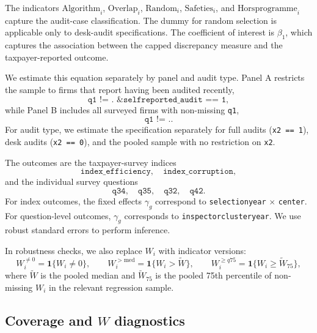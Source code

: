 \documentclass{article}
\newcommand{\OutPath}{Output/}%
\newcommand{\OutPath}{../Output/}%
\begin{document}
The indicators \(\text{Algorithm}_i\), \(\text{Overlap}_i\), \(\text{Random}_i\), \(\text{Safeties}_i\), and \(\text{Horsprogramme}_i\) capture the audit-case classification. The dummy for random selection is applicable only to desk-audit specifications. The coefficient of interest is \(\beta_1\), which captures the association between the capped discrepancy measure and the taxpayer-reported outcome.

We estimate this equation separately by panel and audit type. Panel A restricts the sample to firms that report having been audited recently,
\[
\texttt{q1 != . \& selfreported\_audit == 1},
\]
while Panel B includes all surveyed firms with non-missing \texttt{q1},
\[
\texttt{q1 != .}.
\]
For audit type, we estimate the specification separately for full audits (\texttt{x2 == 1}), desk audits (\texttt{x2 == 0}), and the pooled sample with no restriction on \texttt{x2}.

The outcomes are the taxpayer-survey indices
\[
\texttt{index\_efficiency}, \quad \texttt{index\_corruption},
\]
and the individual survey questions
\[
\texttt{q34}, \quad \texttt{q35}, \quad \texttt{q32}, \quad \texttt{q42}.
\]
For index outcomes, the fixed effects \(\gamma_g\) correspond to \texttt{selectionyear} \(\times\) \texttt{center}. For question-level outcomes, \(\gamma_g\) corresponds to \texttt{inspectorclusteryear}. We use robust standard errors to perform inference.

In robustness checks, we also replace \(W_i\) with indicator versions:
\[
W_i^{\neq 0}=\mathbf{1}\{W_i\neq 0\},
\qquad
W_i^{>\mathrm{med}}=\mathbf{1}\{W_i>\widetilde{W}\},
\qquad
W_i^{\ge q75}=\mathbf{1}\{W_i\ge\widetilde{W}_{75}\},
\]
where \(\widetilde{W}\) is the pooled median and \(\widetilde{W}_{75}\) is the pooled 75th percentile of non-missing \(W_i\) in the relevant regression sample.

\subsection{Coverage and \(W\) diagnostics}

\begin{table}[!htbp]
\centering
{}
\end{table}
\end{document}
